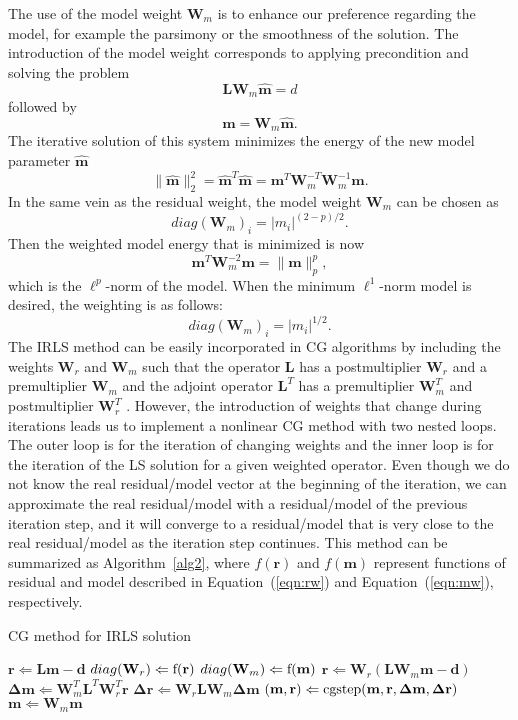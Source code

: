 The use of the model weight $\mathbf W_m$ is to enhance our preference regarding the model, 
for example the parsimony or the smoothness of the solution.
The introduction of the model weight corresponds to applying precondition
and solving the problem
$$ \mathbf L \mathbf W_m \hat {\mathbf m} = d$$
followed by
$$ \mathbf m = \mathbf W_m \mathbf{ \hat{m}}.$$
The iterative solution of this system minimizes the energy of the new model parameter $\mathbf{\hat m}$
$$\| \hat{ \mathbf m} \|_2^2 = \mathbf{\hat{m}}^T \mathbf{\hat{m}} = \mathbf m^T \mathbf W_m^{-T}\mathbf W_m^{-1}\mathbf m.$$
In the same vein as the residual weight, the model weight $\mathbf W_m$ can be chosen as
\begin{equation}
diag ({\mathbf W_m})_i = |m_i|^{(2-p)/2}.
\label{eqn:mw}
\end{equation}
Then the weighted model energy that is minimized is now
$$ \mathbf m^T \mathbf W_m^{-2} \mathbf m = \|\mathbf m\|_p^p, $$
which is the $\ell^p$-norm of the model.
When the minimum $\ell^1$-norm model is desired, the weighting is as follows:
$$ diag ({\mathbf W_m})_i = |m_i|^{1/2}.$$ 
The IRLS method can be easily incorporated in CG algorithms by including
the weights $\mathbf W_r$ and $\mathbf W_m$ 
such that the operator $\mathbf L$ has a postmultiplier $\mathbf W_r$ 
and a premultiplier $\mathbf W_m$ 
and the adjoint operator $\mathbf L^T$ has a premultiplier $\mathbf W_m^T$ and
postmultiplier $\mathbf W_r^T$ \cite{Claerbout.iee.www}.
However, the introduction of weights that change during iterations
leads us to implement a nonlinear CG method with two nested loops.
The outer loop is for the iteration of changing weights
and the inner loop is for the iteration of the LS solution for a given weighted operator.
Even though we do not know the real residual/model vector 
at the beginning of the iteration, 
we can approximate the real residual/model with a residual/model 
of the previous iteration step, and it will converge to 
a residual/model that is very close to the real residual/model as the iteration step continues. 
This method can be summarized as Algorithm~\ref{alg2}, where $f(\mathbf r)$ and $f(\mathbf m)$ represent
functions of residual and model described in Equation~(\ref{eqn:rw}) and Equation~(\ref{eqn:mw}), respectively.

\begin{algorithm}
\caption{ CG method for IRLS solution}
\label{alg2}
\begin{algorithmic}
\STATE $ \mathbf r \Leftarrow \mathbf L \mathbf m - \mathbf d $
\STATE $ {diag } (\mathbf W_r )\Leftarrow \rm f (\mathbf r) $
\STATE $ {diag } (\mathbf W_m )\Leftarrow \rm f (\mathbf m) $
\STATE $ \mathbf r \Leftarrow \mathbf W_r ( \mathbf L \mathbf W_m \mathbf m - \mathbf d ) $
\STATE $ \mathbf \Delta \mathbf m \Leftarrow \mathbf W_m^T \mathbf L^T \mathbf W_r^T \mathbf r $
\STATE $ \mathbf \Delta \mathbf r \Leftarrow \mathbf W_r \mathbf L \mathbf W_m \mathbf \Delta \mathbf m $
\STATE $ (\mathbf m, \mathbf r) \Leftarrow \rm cgstep(\mathbf m, \mathbf r, \mathbf \Delta \mathbf m, \mathbf \Delta \mathbf r)  $
\ENDWHILE
\STATE $ \mathbf m \Leftarrow \mathbf W_m \mathbf m $
\ENDWHILE
\end{algorithmic}
\end{algorithm}

